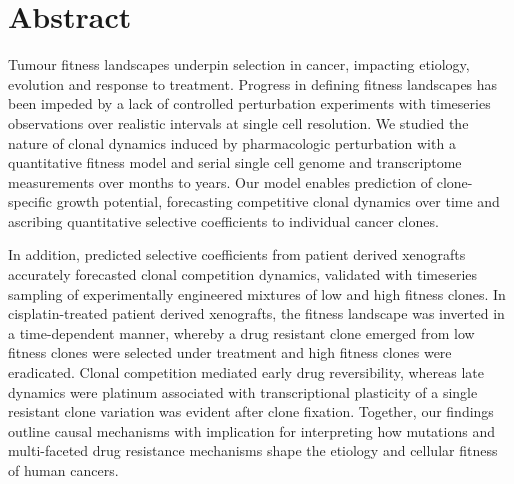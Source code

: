 

\section*{Abstract}
Tumour fitness landscapes underpin selection in cancer, impacting etiology, evolution and response to treatment. Progress in defining fitness landscapes has been impeded by a lack of controlled perturbation experiments with timeseries observations over realistic intervals at single cell resolution.
We studied the nature of clonal dynamics induced by  pharmacologic perturbation with a quantitative fitness model and serial single cell genome and transcriptome measurements over months to years. 
Our model enables prediction of clone-specific growth potential, forecasting competitive clonal dynamics over time and ascribing  quantitative selective coefficients to individual cancer clones. 

In addition, predicted selective coefficients from patient derived xenografts accurately forecasted clonal competition dynamics, validated with timeseries sampling of experimentally engineered mixtures of low and high fitness clones.
In cisplatin-treated patient derived xenografts, the fitness landscape was inverted in a time-dependent manner, whereby a drug resistant clone emerged from low fitness clones were selected under treatment and high fitness clones were eradicated. 
Clonal competition mediated early drug reversibility, whereas late dynamics were platinum associated with transcriptional plasticity  of  a  single  resistant  clone variation was evident after clone fixation. 
Together, our findings outline causal mechanisms with implication for interpreting how mutations and multi-faceted drug resistance mechanisms shape the etiology and cellular fitness of human cancers.


